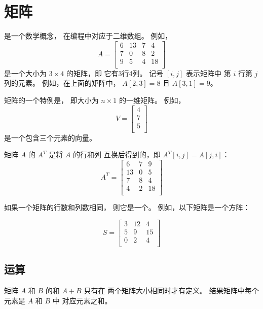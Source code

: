 \chapter{矩阵}


是一个数学概念，
在编程中对应于二维数组。
例如，
\[
A = 
 \begin{bmatrix}
  6 & 13 & 7 & 4 \\
  7 & 0 & 8 & 2 \\
  9 & 5 & 4 & 18 \\
 \end{bmatrix}
\]
是一个大小为 $3 \times 4$ 的矩阵，即
它有3行4列。
记号 $[i,j]$ 表示矩阵中
第 $i$ 行第 $j$ 列的元素。
例如，在上面的矩阵中，
$A[2,3]=8$ 且 $A[3,1]=9$。


矩阵的一个特例是，
即大小为 $n \times 1$ 的一维矩阵。
例如，
\[
V =
\begin{bmatrix}
4 \\
7 \\
5 \\
\end{bmatrix}
\]
是一个包含三个元素的向量。


矩阵 $A$ 的 $A^T$ 是将 $A$ 的行和列
互换后得到的，即 $A^T[i,j]=A[j,i]$：
\[
A^T = 
 \begin{bmatrix}
  6 & 7 & 9 \\
  13 & 0 & 5 \\
  7 & 8 & 4 \\
  4 & 2 & 18 \\
 \end{bmatrix}
\]


如果一个矩阵的行数和列数相同，
则它是一个。
例如，以下矩阵是一个方阵：

\[
S = 
 \begin{bmatrix}
  3 & 12 & 4  \\
  5 & 9 & 15  \\
  0 & 2 & 4 \\
 \end{bmatrix}
\]

\section{运算}

矩阵 $A$ 和 $B$ 的和 $A+B$ 只有在
两个矩阵大小相同时才有定义。
结果矩阵中每个元素是 $A$ 和 $B$ 中
对应元素之和。

